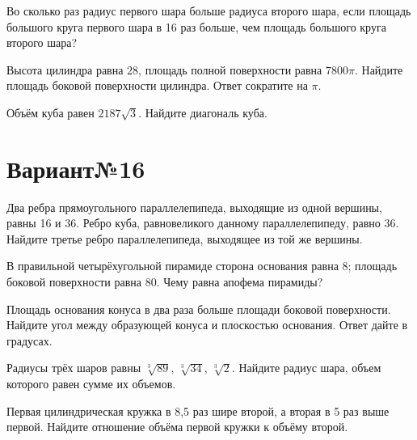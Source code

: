 \documentclass[4apaper]{article}
\begin{document}
\begin{taskBN}{4}
Во сколько раз радиус первого шара больше радиуса второго шара, если площадь большого круга первого шара в 16 раз больше, чем площадь большого круга второго шара?
\end{taskBN}

\begin{taskBN}{5}
Высота цилиндра равна $28$, площадь полной поверхности равна $7800\pi$. Найдите площадь боковой поверхности цилиндра. Ответ сократите на $\pi$.
\end{taskBN}

\begin{taskBN}{6}
Объём куба равен $2187\sqrt{3}$. Найдите диагональ куба.
\end{taskBN}
\newpage\section*{Вариант№16}

\begin{taskBN}{1}
Два ребра прямоугольного параллелепипеда, выходящие из одной вершины, равны 16 и 36. Ребро куба, равновеликого данному параллелепипеду, равно 36. Найдите третье ребро параллелепипеда, выходящее из той же вершины.
\end{taskBN}

\begin{taskBN}{2}
В правильной четырёхугольной пирамиде сторона основания равна 8; площадь боковой поверхности равна 80. Чему равна апофема пирамиды?
\end{taskBN}

\begin{taskBN}{3}
Площадь основания конуса в два раза больше площади боковой поверхности. Найдите угол между образующей конуса и плоскостью основания. Ответ дайте в градусах.
\end{taskBN}

\begin{taskBN}{4}
Радиусы трёх шаров равны $\sqrt[3]{89}$, $\sqrt[3]{34}$, $\sqrt[3]{2}$. Найдите радиус шара, объем которого равен сумме их объемов.
\end{taskBN}

\begin{taskBN}{5}
 Первая цилиндрическая кружка в 8,5 раз шире второй, а вторая в 5 раз выше первой. Найдите отношение объёма первой кружки к объёму второй.
\end{taskBN}
\end{document}

